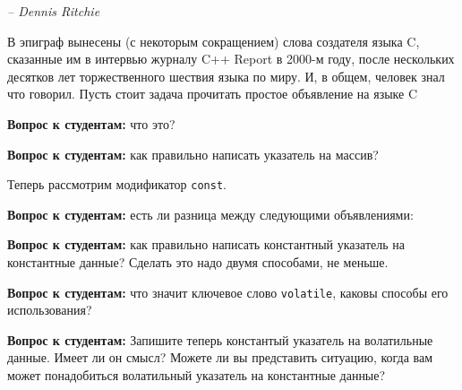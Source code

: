 \documentclass[a4paper,12pt,oneside]{article}
\newif\ifanswers
\begin{document}
\hfill\textit{-- Dennis Ritchie}

В эпиграф вынесены (с некоторым сокращением) слова создателя языка C, сказанные им в интервью журналу C++ Report в 2000-м году, после нескольких десятков лет торжественного шествия языка по миру. И, в общем, человек знал что говорил. Пусть стоит задача прочитать простое объявление на языке C



\textbf{Вопрос к студентам:} что это? 

\ifanswers
Ответ: да, это массив указателей\index{Array of pointers}. 
\fi

\textbf{Вопрос к студентам:} как правильно написать указатель на массив?

\ifanswers
Ответ\index{Pointer to array}:


\fi

Теперь рассмотрим модификатор \lstinline!const!. 

\textbf{Вопрос к студентам:} есть ли разница между следующими объявлениями:



\ifanswers
Ответ: между первым и вторым нет, между вторым и третьим очень существенная разница. Во втором случае (как и в первом) речь идёт о \textbf{не константном} указателе на константные данные. В третьем случае речь идёт о \textbf{константном} указателе на не константные данные. Обратите внимание -- объявляя константу мы не можем оставить её неинициализированной, поэтому инициализатор выделяет строчку, где объявлен константный указатель. В то же время, указатель на константные данные сам может быть неконстантным и инициализации не требует (хотя она возможна).
\fi

\textbf{Вопрос к студентам:} как правильно написать константный указатель на константные данные? Сделать это надо двумя способами, не меньше.

\textbf{Вопрос к студентам:} что значит ключевое слово \lstinline!volatile!, каковы способы его использования?

\textbf{Вопрос к студентам:} Запишите теперь константый указатель на волатильные данные. Имеет ли он смысл? Можете ли вы представить ситуацию, когда вам может понадобиться волатильный указатель на константные данные?

\ifanswers
Ответы на первые два вопроса очевидны, но ответ на третий может быть несколько экзотичен: если этот указатель \lstinline!register! переменная, которая определяет область памяти откуда идёт чтение и которая при этом соответсвует не настоящему регистру а некоему устройству, притворяющемуся регистром, но допускающему смену состояний, то конструкция обретает смысл.
\fi
\end{document}
